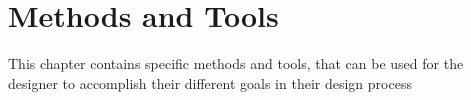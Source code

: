\chapter{Methods and Tools} \label{chap:methods}
This chapter contains specific methods and tools, that can be used for the
designer to accomplish their different goals in their design process





